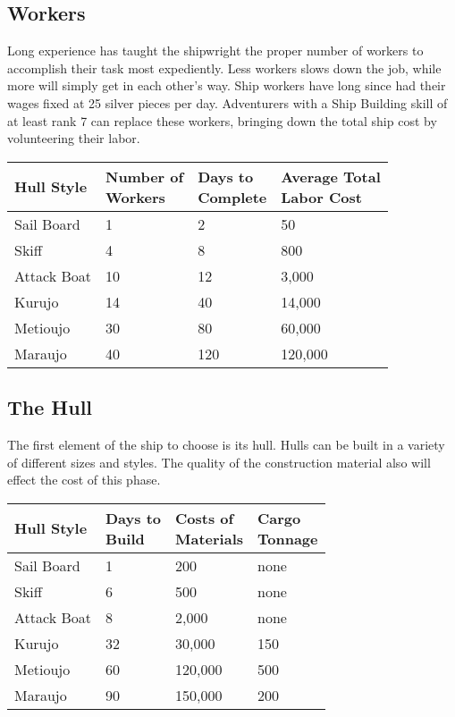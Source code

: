 \subsection{Workers}
Long experience has taught the shipwright the proper number of workers to accomplish their task most expediently. Less workers slows down the job, while more will simply get in each other's way. Ship workers have long since had their wages fixed at 25 silver pieces per day. Adventurers with a Ship Building skill of at least rank 7 can replace these workers, bringing down the total ship cost by volunteering their labor.

\begin{normboxc}
\small
\begin{tabular}{@{}l l l l}
Hull Style & \makecell{Number of\\Workers} & \makecell{Days to\\Complete} & \makecell{Average Total\\Labor Cost}\\

\midrule
Sail Board & 1 & 2 & 50\\
Skiff & 4 & 8 & 800\\
Attack Boat & 10 & 12 & 3,000\\
Kurujo & 14 & 40 & 14,000\\
Metioujo & 30 & 80 & 60,000\\
Maraujo & 40 & 120 & 120,000\\
\end{tabular}
\end{normboxc}
\subsection{The Hull}
The first element of the ship to choose is its hull. Hulls can be built in a variety of different sizes and styles. The quality of the construction material also will effect the cost of this phase.

\begin{normboxc}
\small
\begin{tabular}{@{}llll}
Hull Style & \makecell{Days to\\Build} & \makecell{Costs of\\ Materials} & \makecell{Cargo\\Tonnage}\\
\midrule
Sail Board & 1 & 200 & none\\
Skiff & 6 & 500 & none\\
Attack Boat & 8 & 2,000 & none\\
Kurujo & 32 & 30,000 & 150\\
Metioujo & 60 & 120,000 & 500\\
Maraujo & 90 & 150,000 & 200\\
\end{tabular}
\end{normboxc}

